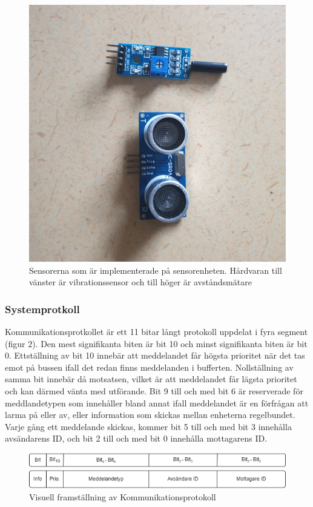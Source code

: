 \documentclass{article}
\begin{document}
\begin{figure}[h]
    \centering
    \includegraphics[scale=0.05]{Projektrapport/sensor.png}
    \caption {Sensorerna som är implementerade på sensorenheten. Hårdvaran till vänster är vibrationssensor och till höger är avståndsmätare}
    \label{fig:drawing}
\end{figure}
\subsubsection{Systemprotkoll}
Kommunikationsprotkollet är ett 11 bitar långt protokoll uppdelat i fyra segment (figur 2).
Den mest signifikanta biten är bit 10 och minst signifikanta biten är bit 0. 
Ettställning av bit 10 innebär att meddelandet får högsta prioritet när det tas emot på bussen ifall det redan finns meddelanden i bufferten.
Nollställning av samma bit innebär då motsatsen, vilket är att meddelandet får lägsta prioritet och kan därmed vänta med utförande. 
Bit 9 till och med bit 6 är reserverade för meddlandetypen som innehåller bland annat ifall meddelandet är en förfrågan att larma på eller av, eller information som skickas mellan enheterna regelbundet. 
Varje gång ett meddelande skickas, kommer bit 5 till och med bit 3 innehålla avsändarens ID, och bit 2 till och med bit 0 innehålla mottagarens ID.

\begin{figure}[h]
    \centering
    \includegraphics[scale=0.5]{Projektrapport/protokoll.png}
    \caption {Visuell framställning av Kommunikationsprotokoll}
    \label{fig:drawing}
\end{figure}
\end{document}
